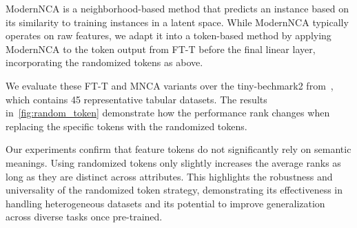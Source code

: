 ModernNCA is a neighborhood-based method that predicts an instance based on its similarity to training instances in a latent space. While ModernNCA typically operates on raw features, we adapt it into a token-based method by applying ModernNCA to the token output from FT-T before the final linear layer, incorporating the randomized tokens as above. 

We evaluate these FT-T and MNCA variants over the tiny-bechmark2 from~\citet{Ye2024Closer}, which contains 45 representative tabular datasets. The results in~\autoref{fig:random_token} demonstrate how the performance rank changes when replacing the specific tokens with the randomized tokens. 

 Our experiments confirm that feature tokens do not significantly rely on semantic meanings. Using randomized tokens only slightly increases the average ranks as long as they are distinct across attributes. This highlights the robustness and universality of the randomized token strategy, demonstrating its effectiveness in handling heterogeneous datasets and its potential to improve generalization across diverse tasks once pre-trained.